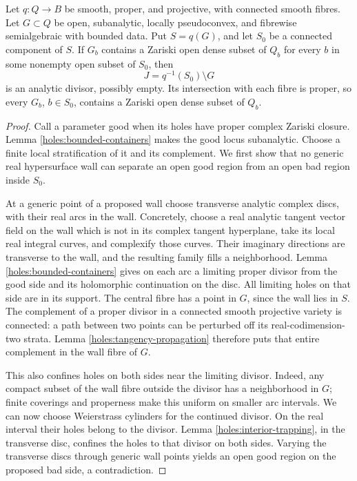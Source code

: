 \begin{proposition}
\label{holes:projective-propagation}
Let $q:Q\to B$ be smooth, proper, and projective, with connected
smooth fibres. Let $G\subset Q$ be open, subanalytic, locally
pseudoconvex, and fibrewise semialgebraic with bounded data.
Put $S=q(G)$, and let $S_0$ be a connected component of $S$.
If $G_b$ contains a Zariski open dense subset of $Q_b$ for every
$b$ in some nonempty open subset of $S_0$, then
\[
 J=q^{-1}(S_0)\setminus G
\]
is an analytic divisor, possibly empty. Its intersection with
each fibre is proper, so every $G_b$, $b\in S_0$, contains a
Zariski open dense subset of $Q_b$.
\end{proposition}

\begin{proof}
Call a parameter good when its holes have proper complex Zariski
closure. Lemma \ref{holes:bounded-containers} makes the good locus
subanalytic. Choose a finite local stratification of it and its
complement. We first show that no generic real hypersurface wall
can separate an open good region from an open bad region inside
$S_0$.

At a generic point of a proposed wall choose transverse analytic
complex discs, with their real arcs in the wall. Concretely, choose
a real analytic tangent vector field on the wall which is not in
its complex tangent hyperplane, take its local real integral curves,
and complexify those curves. Their imaginary directions are
transverse to the wall, and the resulting family fills a neighborhood.
Lemma
\ref{holes:bounded-containers} gives on each arc a limiting proper
divisor from the good side and its holomorphic continuation on
the disc. All limiting holes on that side are in its support.
The central fibre has a point in $G$, since the wall lies in $S$.
The complement of a proper divisor in a connected smooth
projective variety is connected: a path between two points can
be perturbed off its real-codimension-two strata. Lemma
\ref{holes:tangency-propagation} therefore puts that entire
complement in the wall fibre of $G$.

This also confines holes on both sides near the limiting divisor.
Indeed, any compact subset of the wall fibre outside the divisor
has a neighborhood in $G$; finite coverings and properness make
this uniform on smaller arc intervals. We can now choose
Weierstrass cylinders for the continued divisor. On the real
interval their holes belong to the divisor. Lemma
\ref{holes:interior-trapping}, in the transverse disc, confines
the holes to that divisor on both sides. Varying the transverse
discs through generic wall points yields an open good region on
the proposed bad side, a contradiction.


\end{proof}
